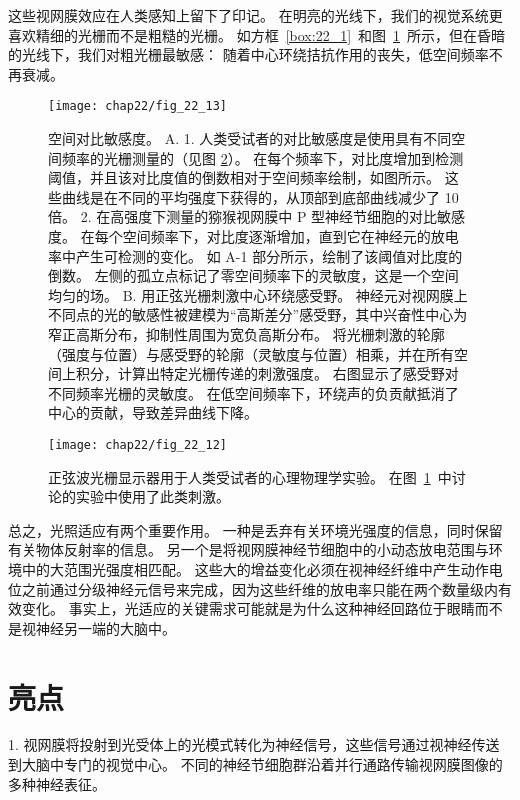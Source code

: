 这些视网膜效应在人类感知上留下了印记。
在明亮的光线下，我们的视觉系统更喜欢精细的光栅而不是粗糙的光栅。
如方框~\ref{box:22_1}~和图~\ref{fig:22_13}~所示，但在昏暗的光线下，我们对粗光栅最敏感：
随着中心环绕拮抗作用的丧失，低空间频率不再衰减。


\begin{figure}[htbp]
	\centering
	\texttt{[image: chap22/fig\_22\_13]}
	\caption{空间对比敏感度。 
		A. 1. 人类受试者的对比敏感度是使用具有不同空间频率的光栅测量的（见图 \ref{fig:22_12}）。 
		在每个频率下，对比度增加到检测阈值，并且该对比度值的倒数相对于空间频率绘制，如图所示。 
		这些曲线是在不同的平均强度下获得的，从顶部到底部曲线减少了 10 倍\cite{de1974psychophysical}。
		2. 在高强度下测量的猕猴视网膜中 P 型神经节细胞的对比敏感度。 
		在每个空间频率下，对比度逐渐增加，直到它在神经元的放电率中产生可检测的变化。
		如 A-1 部分所示，绘制了该阈值对比度的倒数。 
		左侧的孤立点标记了零空间频率下的灵敏度，这是一个空间均匀的场\cite{derrington1984spatial}。
		B. 用正弦光栅刺激中心环绕感受野。
		神经元对视网膜上不同点的光的敏感性被建模为“高斯差分”感受野，其中兴奋性中心为窄正高斯分布，抑制性周围为宽负高斯分布。
		将光栅刺激的轮廓（强度与位置）与感受野的轮廓（灵敏度与位置）相乘，并在所有空间上积分，计算出特定光栅传递的刺激强度。
		右图显示了感受野对不同频率光栅的灵敏度。
		在低空间频率下，环绕声的负贡献抵消了中心的贡献，导致差异曲线下降\cite{enroth1984functional}。}
	\label{fig:22_13}
\end{figure}


\begin{figure}[htbp]
	\centering
	\texttt{[image: chap22/fig\_22\_12]}
	\caption{正弦波光栅显示器用于人类受试者的心理物理学实验。
		在图~\ref{fig:22_13}~中讨论的实验中使用了此类刺激。}
	\label{fig:22_12}
\end{figure}


总之，光照适应有两个重要作用。
一种是丢弃有关环境光强度的信息，同时保留有关物体反射率的信息。
另一个是将视网膜神经节细胞中的小动态放电范围与环境中的大范围光强度相匹配。
这些大的增益变化必须在视神经纤维中产生动作电位之前通过分级神经元信号来完成，因为这些纤维的放电率只能在两个数量级内有效变化。
事实上，光适应的关键需求可能就是为什么这种神经回路位于眼睛而不是视神经另一端的大脑中。



\section{亮点}

1. 视网膜将投射到光受体上的光模式转化为神经信号，这些信号通过视神经传送到大脑中专门的视觉中心。 
不同的神经节细胞群沿着并行通路传输视网膜图像的多种神经表征。


